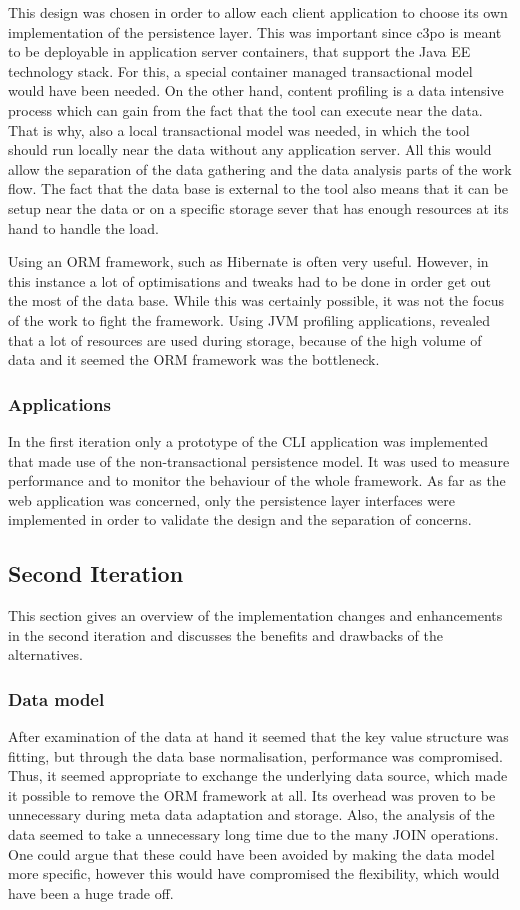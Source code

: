This design was chosen in order to allow each client application to choose its own implementation of the persistence layer. This was important since c3po is meant to be deployable in application server containers, that support the Java EE technology stack. For this, a special container managed transactional model would have been needed. On the other hand, content profiling is a data intensive process which can gain from the fact that the tool can execute near the data. That is why, also a local transactional model was needed, in which the tool should run locally near the data without any application server. All this would allow the separation of the data gathering and the data analysis parts of the work flow. The fact that the data base is external to the tool also means that it can be setup near the data or on a specific storage sever that has enough resources at its hand to handle the load.

Using an ORM framework, such as Hibernate is often very useful. However, in this instance a lot of optimisations and tweaks had to be done in order get out the most of the data base. While this was certainly possible, it was not the focus of the work to fight the framework. Using JVM profiling applications, revealed that a lot of resources are used during storage, because of the high volume of data and it seemed the ORM framework was the bottleneck.

\subsubsection{Applications}
In the first iteration only a prototype of the CLI application was implemented that made use of the non-transactional persistence model. It was used to measure performance and to monitor the behaviour of the whole framework. As far as the web application was concerned, only the persistence layer interfaces were implemented in order to validate the design and the separation of concerns.

\subsection{Second Iteration}
This section gives an overview of the implementation changes and enhancements in the second iteration and discusses the benefits and drawbacks of the alternatives.

\subsubsection{Data model}
After examination of the data at hand it seemed that the key value structure was fitting, but through the data base normalisation, performance was compromised. Thus, it seemed appropriate to exchange the underlying data source, which made it possible to remove the ORM framework at all. Its overhead was proven to be unnecessary during meta data adaptation and storage. Also, the analysis of the data seemed to take a unnecessary long time due to the many JOIN operations. One could argue that these could have been avoided by making the data model more specific, however this would have compromised the flexibility, which would have been a huge trade off.

